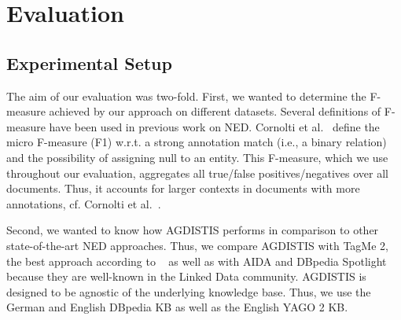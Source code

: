 \documentclass{llncs}
\begin{document}
\section{Evaluation}
\label{sec:eval}

\subsection{Experimental Setup}
\label{eval}
The aim of our evaluation was two-fold.
First, we wanted  to determine the F-measure achieved by our approach on different datasets.
Several definitions of F-measure have been used in previous work on NED.
Cornolti et al.~\cite{Cornolti} define the micro F-measure (F1) w.r.t. a strong annotation match (i.e., a binary relation) and the possibility of assigning null to an entity.
This F-measure, which we use throughout our evaluation, aggregates all true/false positives/negatives over all documents.
Thus, it accounts for larger contexts in documents with more annotations, cf. Cornolti et al.~\cite{Cornolti}.


Second, we wanted to know how AGDISTIS performs in comparison to other state-of-the-art NED approaches. 
Thus, we compare AGDISTIS with TagMe 2, the best approach according to ~\cite{Cornolti} as well as with AIDA and DBpedia Spotlight because they are well-known in the Linked Data community. 
AGDISTIS is designed to be agnostic of the underlying knowledge base.
Thus, we use the German and English DBpedia KB as well as the English YAGO 2 KB. %
\end{document}
